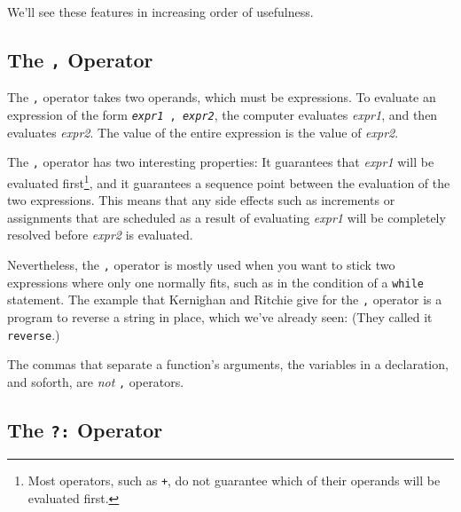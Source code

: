 We'll see these features in increasing order of usefulness.

\subsection{The {\tt ,} Operator}

The {\tt ,} operator takes two operands, which must be expressions.  To
evaluate an expression of the form {\tt {\em expr1} , {\em expr2}}, the
computer evaluates {\em expr1}\/, and then evaluates {\em expr2}\/.  The
value of the entire expression is the value of {\em expr2}\/.  

The {\tt ,} operator has two interesting properties: It guarantees that
{\em expr1}\/ will be evaluated first\footnote{Most operators, such as
{\tt +}, do not guarantee which of their operands will be evaluated
first.}, and it guarantees a sequence point between the evaluation of
the two expressions.  This means that any side effects such as
increments or assignments that are scheduled as a result of evaluating
{\em expr1} will be completely resolved before {\em expr2}\/ is
evaluated.

Nevertheless, the {\tt ,} operator is mostly used when you want to stick
two expressions where only one normally fits, such as in the condition
of a {\tt while} statement.  The example that Kernighan and Ritchie give
for the {\tt ,} operator is a program to reverse a string in place,
which we've already seen:  (They called it {\tt reverse}.)

\begin{flushleft}
\verb% void strrev(char *s)% \\*
\verb% {% \\*
\verb%   int c, i, j;% \\*
\verb% % \\*
\verb%   for (i=0, j=strlen(s)-1;  i<j;  i++, j++) {% \\*
\verb%     c = s[i];% \\*
\verb%     s[i] = s[j];% \\*
\verb%     s[j] = c;% \\*
\verb%   }% \\*
\verb% }% \\*
\end{flushleft}

The commas that separate a function's arguments, the variables in a
declaration, and soforth, are {\em not}\/ {\tt ,} operators.

\subsection{The {\tt ?:} Operator}

